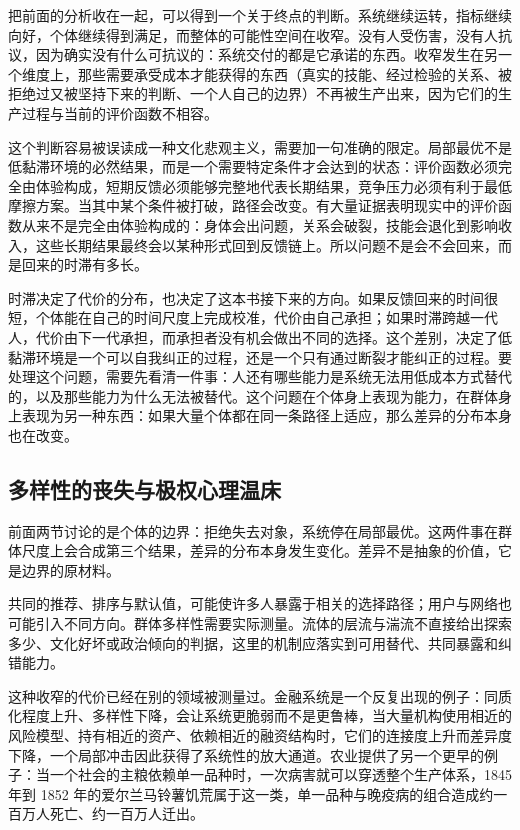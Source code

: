 
把前面的分析收在一起，可以得到一个关于终点的判断。系统继续运转，指标继续向好，个体继续得到满足，而整体的可能性空间在收窄。没有人受伤害，没有人抗议，因为确实没有什么可抗议的：系统交付的都是它承诺的东西。收窄发生在另一个维度上，那些需要承受成本才能获得的东西（真实的技能、经过检验的关系、被拒绝过又被坚持下来的判断、一个人自己的边界）不再被生产出来，因为它们的生产过程与当前的评价函数不相容。

这个判断容易被误读成一种文化悲观主义，需要加一句准确的限定。局部最优不是低黏滞环境的必然结果，而是一个需要特定条件才会达到的状态：评价函数必须完全由体验构成，短期反馈必须能够完整地代表长期结果，竞争压力必须有利于最低摩擦方案。当其中某个条件被打破，路径会改变。有大量证据表明现实中的评价函数从来不是完全由体验构成的：身体会出问题，关系会破裂，技能会退化到影响收入，这些长期结果最终会以某种形式回到反馈链上。所以问题不是会不会回来，而是回来的时滞有多长。

时滞决定了代价的分布，也决定了这本书接下来的方向。如果反馈回来的时间很短，个体能在自己的时间尺度上完成校准，代价由自己承担；如果时滞跨越一代人，代价由下一代承担，而承担者没有机会做出不同的选择。这个差别，决定了低黏滞环境是一个可以自我纠正的过程，还是一个只有通过断裂才能纠正的过程。要处理这个问题，需要先看清一件事：人还有哪些能力是系统无法用低成本方式替代的，以及那些能力为什么无法被替代。这个问题在个体身上表现为能力，在群体身上表现为另一种东西：如果大量个体都在同一条路径上适应，那么差异的分布本身也在改变。

\subsection{多样性的丧失与极权心理温床}

前面两节讨论的是个体的边界：拒绝失去对象，系统停在局部最优。这两件事在群体尺度上会合成第三个结果，差异的分布本身发生变化。差异不是抽象的价值，它是边界的原材料。


共同的推荐、排序与默认值，可能使许多人暴露于相关的选择路径；用户与网络也可能引入不同方向。群体多样性需要实际测量。流体的层流与湍流不直接给出探索多少、文化好坏或政治倾向的判据，这里的机制应落实到可用替代、共同暴露和纠错能力。

这种收窄的代价已经在别的领域被测量过。金融系统是一个反复出现的例子：同质化程度上升、多样性下降，会让系统更脆弱而不是更鲁棒，当大量机构使用相近的风险模型、持有相近的资产、依赖相近的融资结构时，它们的连接度上升而差异度下降，一个局部冲击因此获得了系统性的放大通道\cite{haldane2011systemic}。农业提供了另一个更早的例子：当一个社会的主粮依赖单一品种时，一次病害就可以穿透整个生产体系，1845 年到 1852 年的爱尔兰马铃薯饥荒属于这一类，单一品种与晚疫病的组合造成约一百万人死亡、约一百万人迁出\cite{ograda1999black}。

